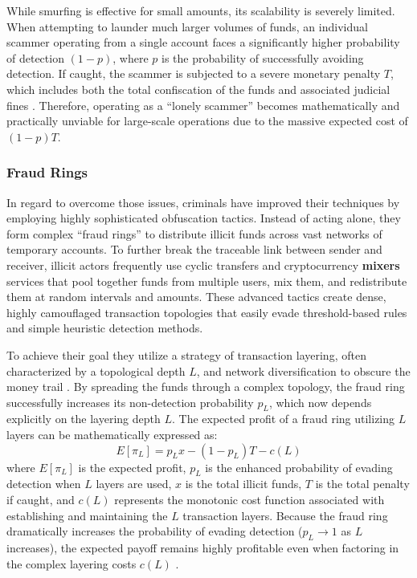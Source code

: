 While smurfing is effective for small amounts, its scalability is severely limited. When attempting to launder much larger volumes of funds, an individual scammer operating from a single account faces a significantly higher probability of detection $(1-p)$, where $p$ is the probability of successfully avoiding detection. If caught, the scammer is subjected to a severe monetary penalty $T$, which includes both the total confiscation of the funds and associated judicial fines \cite{contreras2026strategic}. Therefore, operating as a ``lonely scammer'' becomes mathematically and practically unviable for large-scale operations due to the massive expected cost of $(1-p)T$.

\subsubsection{Fraud Rings}
In regard to overcome those issues, criminals have improved their techniques by employing highly sophisticated obfuscation tactics. Instead of acting alone, they form complex ``fraud rings'' to distribute illicit funds across vast networks of temporary accounts. To further break the traceable link between sender and receiver, illicit actors frequently use cyclic transfers and cryptocurrency \textbf{mixers} services that pool together funds from multiple users, mix them, and redistribute them at random intervals and amounts. These advanced tactics create dense, highly camouflaged transaction topologies that easily evade threshold-based rules and simple heuristic detection methods.

To achieve their goal they utilize a strategy of transaction layering, often characterized by a topological depth $L$, and network diversification to obscure the money trail \cite{contreras2026strategic, li2025scamsweeper}.
By spreading the funds through a complex topology, the fraud ring successfully increases its non-detection probability $p_L$, which now depends explicitly on the layering depth $L$. The expected profit of a fraud ring utilizing $L$ layers can be mathematically expressed as:
\begin{equation}
    E[\pi_L] = p_L x - (1-p_L)T - c(L)
\end{equation}
where $E[\pi_L]$ is the expected profit, $p_L$ is the enhanced probability of evading detection when $L$ layers are used, $x$ is the total illicit funds, $T$ is the total penalty if caught, and $c(L)$ represents the monotonic cost function associated with establishing and maintaining the $L$ transaction layers. Because the fraud ring dramatically increases the probability of evading detection ($p_L \to 1$ as $L$ increases), the expected payoff remains highly profitable even when factoring in the complex layering costs $c(L)$ \cite{contreras2026strategic}. 


